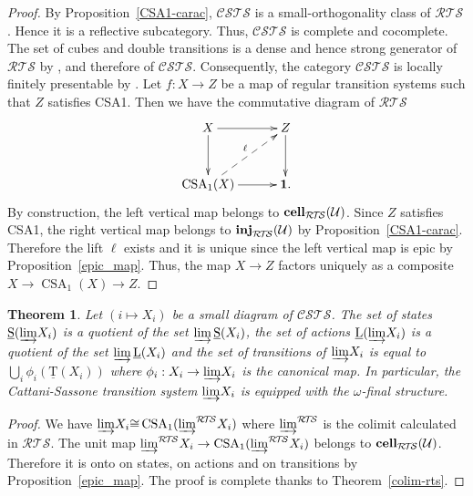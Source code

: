 \documentclass[a4paper,12pt]{amsart}
\newtheorem{thm}{Theorem}[section]
\begin{document}
\begin{proof} By Proposition~\ref{CSA1-carac}, ${\mathcal{C\!S\!T\!S}}$ is a small-orthogonality
class of ${\mathcal{R\!T\!S}}$. Hence it is a reflective subcategory. Thus, ${\mathcal{C\!S\!T\!S}}$
is complete and cocomplete.  The set of cubes and double transitions
is a dense and hence strong generator of ${\mathcal{R\!T\!S}}$ by
\cite[Theorem~3.11]{cubicalhdts}, and therefore of
${\mathcal{C\!S\!T\!S}}$. Consequently, the category ${\mathcal{C\!S\!T\!S}}$ is locally finitely
presentable by \cite[Theorem~1.20]{MR95j:18001}. Let $f:X\to Z$ be a
map of regular transition systems such that $Z$ satisfies CSA1. Then
we have the commutative diagram of ${\mathcal{R\!T\!S}}$
\[
\xymatrix@C=3em@R=3em
{
X {\ar@{->}[r]^-{{}}} {\ar@{->}[d]_-{{}}} & Z {\ar@{->}[d]_-{{}}} \\
\operatorname{CSA}_1(X) \ar@{-->}[ru]^-{\ell} {\ar@{->}[r]^-{{}}} & \mathbf{1}.
}
\]
By construction, the left vertical map belongs to
$\operatorname{{{\rm{\mathbf{{cell}}}}}}_{\mathcal{R\!T\!S}}(\mathcal{U})$. Since $Z$ satisfies CSA1, the right
vertical map belongs to $\operatorname{{{\rm{\mathbf{{inj}}}}}}_{\mathcal{R\!T\!S}}(\mathcal{U})$ by
Proposition~\ref{CSA1-carac}. Therefore the lift $\ell$ exists and it
is unique since the left vertical map is epic by
Proposition~\ref{epic_map}.  Thus, the map $X\to Z$ factors uniquely
as a composite $X\to \operatorname{CSA}_1(X)\to Z$.  \end{proof}

\begin{thm} \label{colim-csts} Let $(i\mapsto X_i)$ be a small diagram of
${\mathcal{C\!S\!T\!S}}$. The set of states $\operatorname{\underline{S}}({\varinjlim} X_i)$ is a quotient of the set
${\varinjlim} \operatorname{\underline{S}}(X_i)$, the set of actions $\operatorname{\underline{L}}({\varinjlim} X_i)$ is a
quotient of the set ${\varinjlim} \operatorname{\underline{L}}(X_i)$ and the set of transitions of
${\varinjlim} X_i$ is equal to $\bigcup_i \phi_i(\operatorname{\underline{T}}(X_i))$ where
$\phi_i:X_i \to {\varinjlim} X_i$ is the canonical map. In particular, the
Cattani-Sassone transition system ${\varinjlim} X_i$ is equipped with the
$\omega$-final structure.  \end{thm}

\begin{proof} We have ${\varinjlim} X_i {\cong} \operatorname{CSA}_1({\varinjlim}^{\mathcal{R\!T\!S}} X_i)$ where
${\varinjlim}^{\mathcal{R\!T\!S}}$ is the colimit calculated in ${\mathcal{R\!T\!S}}$. The unit map
${\varinjlim}^{\mathcal{R\!T\!S}} X_i \to \operatorname{CSA}_1({\varinjlim}^{\mathcal{R\!T\!S}} X_i)$ belongs to
$\operatorname{{{\rm{\mathbf{{cell}}}}}}_{\mathcal{R\!T\!S}}(\mathcal{U})$.  Therefore it is onto on states, on actions
and on transitions by Proposition~\ref{epic_map}. The proof is
complete thanks to Theorem~\ref{colim-rts}.  \end{proof}
\end{document}
